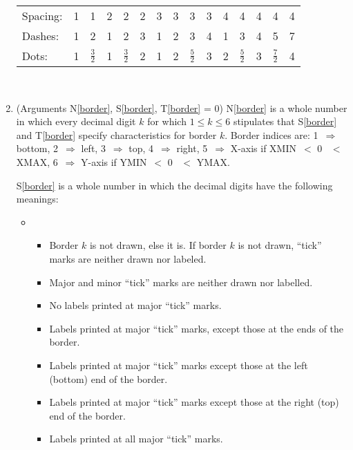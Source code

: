 \documentclass[twoside]{MATH77}
\begin{document}
\begin{multicols}{2}
\begin{enumerate}
{\small
\hspace{-16pt}\begin{tabular}{*{15}{@{\hspace{9pt}}l}}
        Spacing: & 1 & 1 & 2 & 2 & 2 & 3 & 3 & 3 & 3 & 4 & 4 & 4 & 4 & 4
\\
        Dashes:  & 1 & 2 & 1 & 2 & 3 & 1 & 2 & 3 & 4 & 1 & 3 & 4 & 5 & 7
\\
        Dots:    & 1 &$\frac 32$& 1 &$\frac 32$& 2 & 1 & 2 &$\frac 52$&
        3 & 2 &$\frac 52$& 3 & $\frac 72$& 4

        \end{tabular}
}

   \hspace{34pt} \mbox{ }

\item\label{border}  (Arguments N\ref{border}, S\ref{border}, T\ref{border} =
        0)  N\ref{border} is a whole number in which every decimal digit
        $k$ for which $1 \leq k \leq 6$ stipulates that S\ref{border} and
        T\ref{border} specify characteristics for border $k$.  Border
        indices are: 1~$\Rightarrow$ bottom, 2~$\Rightarrow$ left,
        3~$\Rightarrow$ top, 4~$\Rightarrow$ right, 5~$\Rightarrow$
        X-axis if XMIN~$<$ 0 ~$<$ XMAX, 6~$\Rightarrow$ Y-axis if YMIN~$<$
        0 ~$<$ YMAX.

        S\ref{border} is a whole number in which the decimal digits have the
        following meanings:
  \begin{itemize}
  \item[$10^0$]
    \begin{itemize}
    \item[0 =] Border $k$ is not drawn, else it is.  If border $k$ is not
            drawn, ``tick'' marks are neither drawn nor labeled.
    \item[1 =] Major and minor ``tick'' marks are neither drawn nor
            labelled.
    \item[2 =] No labels printed at major ``tick'' marks.
    \item[3 =] Labels printed at major ``tick'' marks,
            except those at the ends of the border.
    \item[4 =] Labels printed at major ``tick'' marks
            except those at the left (bottom) end of the border.
    \item[5 =] Labels printed at major ``tick'' marks
            except those at the right (top) end of the border.
    \item[6 =] Labels printed at all major ``tick'' marks.
    \end{itemize}\vspace{5pt}


\end{itemize}
\end{enumerate}
\end{multicols}
\end{document}
